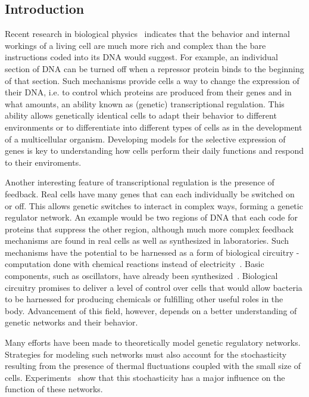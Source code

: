 \documentclass[english,letterpaper,12pt]{article}
\begin{document}
\begin{doublespacing}

\section{Introduction} %
\label{sec:introduction}

Recent research in biological physics~\cite{ecoli-decision} indicates that the behavior and internal workings of a living cell are much more rich and complex than the bare instructions coded into its DNA would suggest. For example, an individual section of DNA can be turned off when a repressor protein binds to the beginning of that section. Such mechanisms provide cells a way to change the expression of their DNA, i.e. to control which proteins are produced from their genes and in what amounts, an ability known as (genetic) transcriptional regulation. This ability allows genetically identical cells to adapt their behavior to different environments or to differentiate into different types of cells as in the development of a multicellular organism. Developing models for the selective expression of genes is key to understanding how cells perform their daily functions and respond to their enviroments.

Another interesting feature of transcriptional regulation is the presence of feedback. Real cells have many  genes that can each individually be switched on or off. This allows genetic switches to interact in complex ways, forming a genetic regulator network. An example would be two regions of DNA that each code for proteins that suppress the other region, although much more complex feedback mechanisms are found in real cells as well as synthesized in laboratories.  Such mechanisms have the potential to be harnessed as a form of biological circuitry - computation done with chemical reactions instead of electricity~\cite{bio-circuits}. Basic components, such as oscillators, have already been synthesized~\cite{synth-osc}. Biological circuitry promises to deliver a level of control over cells that would allow bacteria to be harnessed for producing chemicals or fulfilling other useful roles in the body. Advancement of this field, however, depends on a better understanding of genetic networks and their behavior.

Many efforts have been made to theoretically model genetic regulatory networks.  Strategies for modeling such networks must also account for the stochasticity resulting from the presence of thermal fluctuations coupled with the small size of cells. Experiments~\cite{ecoli-decision} show that this stochasticity has a major influence on the function of these networks.


\end{doublespacing}
\end{document}
